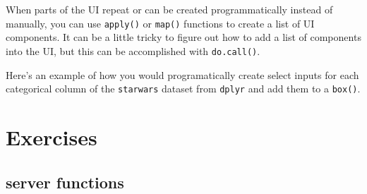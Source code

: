 \documentclass[
]{book}
\newenvironment{Shaded}{\begin{snugshade}}{\end{snugshade}}
\newcommand{\AttributeTok}[1]{\textcolor[rgb]{0.77,0.63,0.00}{#1}}
\newcommand{\CommentTok}[1]{\textcolor[rgb]{0.56,0.35,0.01}{\textit{#1}}}
\newcommand{\ConstantTok}[1]{\textcolor[rgb]{0.00,0.00,0.00}{#1}}
\newcommand{\ControlFlowTok}[1]{\textcolor[rgb]{0.13,0.29,0.53}{\textbf{#1}}}
\newcommand{\DecValTok}[1]{\textcolor[rgb]{0.00,0.00,0.81}{#1}}
\newcommand{\FunctionTok}[1]{\textcolor[rgb]{0.00,0.00,0.00}{#1}}
\newcommand{\NormalTok}[1]{#1}
\newcommand{\OtherTok}[1]{\textcolor[rgb]{0.56,0.35,0.01}{#1}}
\newcommand{\SpecialCharTok}[1]{\textcolor[rgb]{0.00,0.00,0.00}{#1}}
\newcommand{\StringTok}[1]{\textcolor[rgb]{0.31,0.60,0.02}{#1}}
\begin{document}
When parts of the UI repeat or can be created programmatically instead of manually, you can use \texttt{apply()} or \texttt{map()} functions to create a list of UI components. It can be a little tricky to figure out how to add a list of components into the UI, but this can be accomplished with \texttt{do.call()}.

Here's an example of how you would programatically create select inputs for each categorical column of the \texttt{starwars} dataset from \texttt{dplyr} and add them to a \texttt{box()}.

\begin{Shaded}
\end{Shaded}

\hypertarget{exercises-structure}{%
\section{Exercises}\label{exercises-structure}}

\hypertarget{server-functions}{%
\subsection{server functions}\label{server-functions}}
\end{document}
